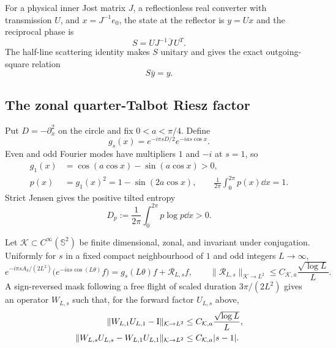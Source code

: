 For a physical inner Jost matrix $J$, a reflectionless real converter with
transmission $U$, and $x=J^{-1}e_0$, the state at the reflector is $y=Ux$ and
the reciprocal phase is
\begin{equation}
 S=UJ^{-1}\overline J\,U^T.
 \label{eq:riesz-reciprocal-phase}
\end{equation}
The half-line scattering identity makes $S$ unitary and gives the exact
outgoing-square relation
\begin{equation}
 S\bar y=y.
 \label{eq:riesz-outgoing-square}
\end{equation}

\subsection{The zonal quarter-Talbot Riesz factor}

Put $D=-\partial_x^2$ on the circle and fix $0<a<\pi/4$.  Define
\begin{equation}
 g_s(x)=e^{-i\pi sD/2}e^{-ias\cos x}.
 \label{eq:flat-talbot-factor}
\end{equation}
Even and odd Fourier modes have multipliers $1$ and $-i$ at $s=1$, so
\begin{align}
 g_1(x)&=\cos(a\cos x)-\sin(a\cos x)>0,
 \label{eq:positive-talbot-factor}\\
 p(x)&=g_1(x)^2=1-\sin(2a\cos x),\qquad
 \frac1{2\pi}\int_0^{2\pi}p(x)\dd x=1.
 \label{eq:talbot-riesz-density}
\end{align}
Strict Jensen gives the positive tilted entropy
\begin{equation}
 D_p:=\frac1{2\pi}\int_0^{2\pi}p\log p\dd x>0.
 \label{eq:talbot-positive-entropy}
\end{equation}

\begin{proposition}
\label{prop:zonal-talbot-factor}
Let $\mathcal K\subset C^\infty(\mathbb S^2)$ be finite dimensional,
zonal, and invariant under conjugation.  Uniformly for $s$ in a fixed compact
neighbourhood of $1$ and odd integers $L\to\infty$,
\begin{equation}
 e^{-i\pi sA_3/(2L^2)}
   \bigl(e^{-ias\cos(L\theta)}f\bigr)
 =g_s(L\theta)f+\mathcal R_{L,s}f,\qquad
 \|\mathcal R_{L,s}\|_{\mathcal K\to L^2}
 \leq C_{\mathcal K,a}\frac{\sqrt{\log L}}L.
 \label{eq:spherical-talbot-asymptotic}
\end{equation}
A sign-reversed mask following a free flight of scaled duration
$3\pi/(2L^2)$ gives an operator $W_{L,s}$ such that, for the forward factor
$U_{L,s}$ above,
\begin{align}
 \|W_{L,1}U_{L,1}-\mathrm I\|_{\mathcal K\to L^2}
 &\leq C_{\mathcal K,a}\frac{\sqrt{\log L}}L,
 \label{eq:talbot-reciprocal-inverse}\\
 \|W_{L,s}U_{L,s}-W_{L,1}U_{L,1}\|_{\mathcal K\to L^2}
 &\leq C_{\mathcal K,a}|s-1|.
 \label{eq:talbot-chromatic-bound}
\end{align}
\end{proposition}

